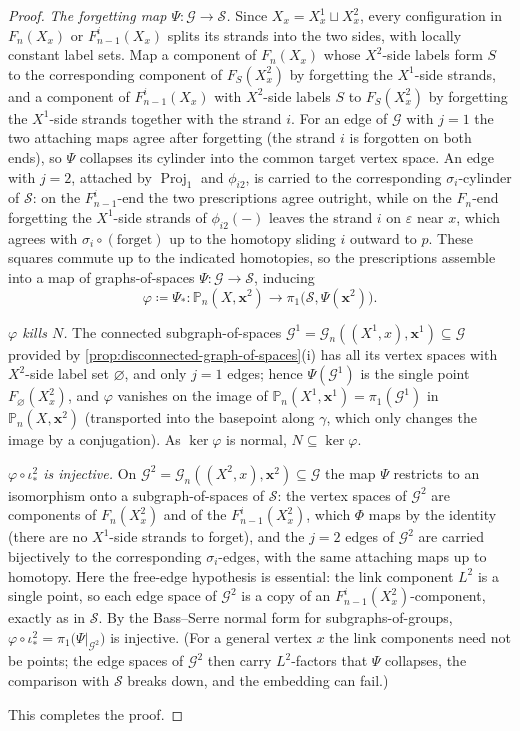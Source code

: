 \documentclass[reqno]{amsart}
\theoremstyle{definition}
\newcommand\bfx{\mathbf{x}}
\newcommand\cG{\mathcal{G}}
\newcommand\cS{\mathcal{S}}
\newcommand{\PB}{\mathbb{P}}
\DeclareMathOperator{\proj}{Proj}
\numberwithin{equation}{section}
\begin{document}
\begin{proof}
\smallskip
\noindent\emph{The forgetting map \(\Psi\colon\cG\to\cS\).}
Since \(X_x=X^1_x\sqcup X^2_x\), every configuration in
\(F_n(X_x)\) or \(F^i_{n-1}(X_x)\) splits its strands into the two
sides, with locally constant label sets. Map a component of
\(F_n(X_x)\) whose \(X^2\)-side labels form \(S\) to the
corresponding component of \(F_S(X^2_x)\) by forgetting the
\(X^1\)-side strands, and a component of \(F^i_{n-1}(X_x)\) with
\(X^2\)-side labels \(S\) to \(F_S(X^2_x)\) by forgetting the
\(X^1\)-side strands together with the strand \(i\). For an edge of
\(\cG\) with \(j=1\) the two attaching maps agree after forgetting
(the strand \(i\) is forgotten on both ends), so \(\Psi\) collapses
its cylinder into the common target vertex space. An edge with
\(j=2\), attached by \(\proj_1\) and \(\phi_{i2}\), is carried to
the corresponding \(\sigma_i\)-cylinder of \(\cS\): on the
\(F^i_{n-1}\)-end the two prescriptions agree outright, while on
the \(F_n\)-end forgetting the \(X^1\)-side strands of
\(\phi_{i2}(-)\) leaves the strand \(i\) on \(\varepsilon\) near
\(x\), which agrees with \(\sigma_i\circ(\text{forget})\) up to the
homotopy sliding \(i\) outward to \(p\). These squares commute up
to the indicated homotopies, so the prescriptions assemble into a
map of graphs-of-spaces \(\Psi\colon\cG\to\cS\), inducing
\[
\varphi\coloneqq\Psi_\ast\colon\PB_n(X,\bfx^2)\longrightarrow
\pi_1\bigl(\cS,\Psi(\bfx^2)\bigr).
\]

\smallskip
\noindent\emph{\(\varphi\) kills \(N\).}
The connected subgraph-of-spaces
\(\cG^1=\cG_n((X^1,x),\bfx^1)\subseteq\cG\) provided by
\cref{prop:disconnected-graph-of-spaces}(i) has all its vertex
spaces with \(X^2\)-side label set \(\varnothing\), and only
\(j=1\) edges; hence \(\Psi(\cG^1)\) is the single point
\(F_\varnothing(X^2_x)\), and \(\varphi\) vanishes on the image of
\(\PB_n(X^1,\bfx^1)=\pi_1(\cG^1)\) in \(\PB_n(X,\bfx^2)\)
(transported into the basepoint along \(\gamma\), which only
changes the image by a conjugation). As \(\ker\varphi\) is normal,
\(N\subseteq\ker\varphi\).

\smallskip
\noindent\emph{\(\varphi\circ\iota^2_\ast\) is injective.}
On \(\cG^2=\cG_n((X^2,x),\bfx^2)\subseteq\cG\) the map \(\Psi\)
restricts to an isomorphism onto a subgraph-of-spaces of \(\cS\):
the vertex spaces of \(\cG^2\) are components of \(F_n(X^2_x)\) and
of the \(F^i_{n-1}(X^2_x)\), which \(\Phi\) maps by the identity
(there are no \(X^1\)-side strands to forget), and the \(j=2\)
edges of \(\cG^2\) are carried bijectively to the corresponding
\(\sigma_i\)-edges, with the same attaching maps up to homotopy.
Here the free-edge hypothesis is essential: the link component
\(L^2\) is a single point, so each edge space of \(\cG^2\) is a
copy of an \(F^i_{n-1}(X^2_x)\)-component, exactly as in \(\cS\).
By the Bass--Serre normal form for subgraphs-of-groups,
\(\varphi\circ\iota^2_\ast=\pi_1\bigl(\Psi|_{\cG^2}\bigr)\) is
injective. (For a general vertex \(x\) the link components need not
be points; the edge spaces of \(\cG^2\) then carry \(L^2\)-factors
that \(\Psi\) collapses, the comparison with \(\cS\) breaks down,
and the embedding can fail.)

This completes the proof.
\end{proof}
\end{document}
